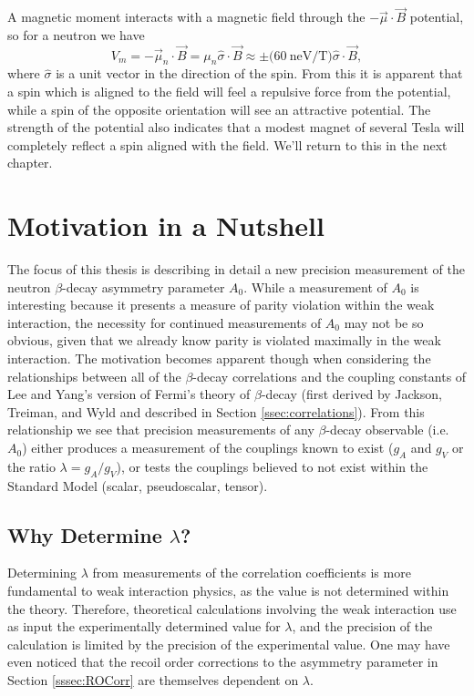 A magnetic moment interacts with a magnetic field through the $-\vec{\mu} \cdot \vec{B}$ potential, so for
a neutron we have
%
\begin{equation}
  V_m = -\vec{\mu}_n \cdot \vec{B} = \mu_n \hat{\sigma} \cdot \vec{B} \approx \pm \big(60 \mathrm{~neV/T}\big)
  \hat{\sigma} \cdot \vec{B}, 
\end{equation}
where $\hat{\sigma}$ is a unit vector in the direction of the spin. From this it is apparent that a spin which is
aligned to the field will feel a repulsive force from the potential, while a spin of the opposite orientation
will see an attractive potential. The strength of the potential also indicates that a modest magnet of several
Tesla will completely reflect a spin aligned with the field. We'll return to this in the next chapter.


\section{Motivation in a Nutshell}

The focus of this thesis is describing in detail a new precision
measurement of the neutron $\beta$-decay asymmetry parameter $A_0$.
While a measurement of $A_0$ is interesting because it presents
a measure of parity
violation within the weak interaction, the necessity for continued measurements of $A_0$
may not be so obvious, given that we already know parity is violated maximally in the
weak interaction. The motivation
becomes apparent though when considering the relationships between all of the
$\beta$-decay correlations and the coupling constants of Lee and Yang's version of Fermi's
theory of $\beta$-decay
(first derived by Jackson, Treiman, and Wyld \cite{jackson1957a} and
described in Section \ref{ssec:correlations}). From this relationship we see that precision
measurements of any $\beta$-decay observable (i.e. $A_0$) either produces a measurement of the couplings
known to exist ($g_A$ and $g_V$ or the ratio $\lambda=g_A/g_V$), or tests the couplings believed to not exist within the
Standard Model (scalar, pseudoscalar, tensor).

\subsection{Why Determine $\lambda$?} \label{sssec:detLambda}

Determining $\lambda$ from measurements of the correlation coefficients is more fundamental to
weak interaction physics, as the value is not determined within the theory. Therefore,
theoretical calculations involving the weak interaction use as input the experimentally
determined value for $\lambda$, and the precision of the calculation is limited by the
precision of the experimental value. One may have even noticed that the recoil order corrections to
the asymmetry parameter in
Section \ref{sssec:ROCorr} are themselves dependent on $\lambda$.

